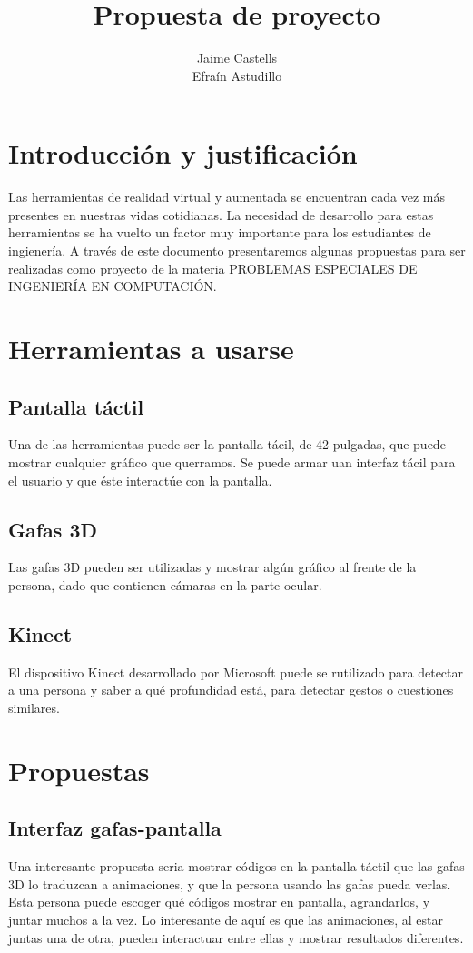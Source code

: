 \documentclass[11pt]{article} %
\title{Propuesta de proyecto}
\author{Jaime Castells\\Efraín Astudillo}
\begin{document}
\maketitle


\section{Introducción y justificación}

Las herramientas de realidad virtual y aumentada se encuentran cada vez más presentes en nuestras vidas cotidianas. La necesidad de desarrollo para estas herramientas se ha vuelto un factor muy importante para los estudiantes de ingienería. A través de este documento presentaremos algunas propuestas para ser realizadas como proyecto de la materia PROBLEMAS ESPECIALES DE INGENIERÍA EN COMPUTACIÓN.

\section{Herramientas a usarse}

\subsection{Pantalla táctil}

Una de las herramientas puede ser la pantalla tácil, de 42 pulgadas, que puede mostrar cualquier gráfico que querramos. Se puede armar uan interfaz tácil para el usuario y que éste interactúe con la pantalla.

\subsection{Gafas 3D}

Las gafas 3D pueden ser utilizadas y mostrar algún gráfico al frente de la persona, dado que contienen cámaras en la parte ocular.

\subsection{Kinect}

El dispositivo Kinect desarrollado por Microsoft puede se rutilizado para detectar a una persona y saber a qué profundidad está, para detectar gestos o cuestiones similares.

\section{Propuestas}

\subsection {Interfaz gafas-pantalla}

Una interesante propuesta seria mostrar códigos en la pantalla táctil que las gafas 3D lo traduzcan a animaciones, y que la persona usando las gafas pueda verlas. Esta persona puede escoger qué códigos mostrar en pantalla, agrandarlos, y juntar muchos a la vez. Lo interesante de aquí es que las animaciones, al estar juntas una de otra, pueden interactuar entre ellas y mostrar resultados diferentes.
\end{document}
